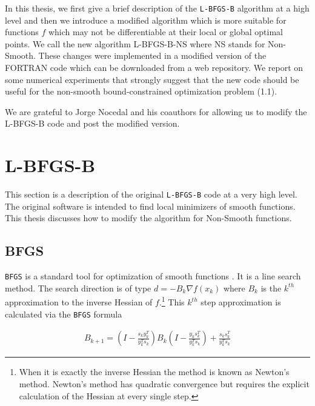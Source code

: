 In this thesis, we first give a brief description of the \texttt{L-BFGS-B} algorithm
at a high level and then we introduce a modified algorithm which
is more suitable for functions $f$ which may not be
differentiable at their local or global optimal points.  
We call the new algorithm L-BFGS-B-NS where NS stands for
Non-Smooth.  These changes were implemented in a modified version 
of the FORTRAN code \citep{lbfgsbNS} which can be downloaded from a web repository.  We report on some numerical experiments 
that strongly suggest that the new code should be useful for the
non-smooth bound-constrained optimization problem (1.1).

We are grateful to Jorge Nocedal and his coauthors for allowing us 
to modify the L-BFGS-B code and post the modified version.  

\chapter{L-BFGS-B}
\label{ChapterConstraints} %

This section is a description of the original \texttt{L-BFGS-B} code \citep{lbfgsbsoftware, codepaper} at a very high level. The original software is intended to find local minimizers of smooth functions. This thesis discusses how to modify the algorithm for Non-Smooth functions.

\section{BFGS}

\texttt{BFGS} is a standard tool for optimization of smooth functions \citep{nocedal}. It is a line search method. The search direction is of type $d = -B_k \nabla f(x_k)$ where $B_k$ is the $k^{th}$ approximation to the inverse Hessian of $f$.\footnote{When it is exactly the inverse Hessian the method is known as Newton's method. Newton's method has quadratic convergence but requires the explicit calculation of the Hessian at every single step.} This $k^{th}$ step approximation is calculated via the \texttt{BFGS} formula

\begin{equation} \label{bfgsupdate}
  \begin{aligned}
    B_{k+1} = \left(I - \frac{s_ky_k^T}{y_k^Ts_k} \right) B_k \left( I - \frac{y_ks_k^T}{y_k^Ts_k} \right) + \frac{s_k s_k^T}{y_k^T s_k}
  \end{aligned}
\end{equation}

